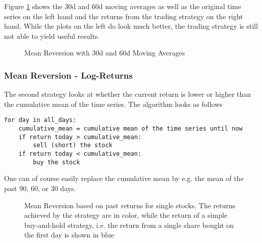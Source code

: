 Figure \ref{fig:30d_60d_plot} shows the 30d and 60d moving averages as well as the original time series on the left hand and the returns from the trading strategy on the right hand. While the plots on the left do look much better, the trading strategy is still not able to yield useful results. 

\begin{figure}[h!]
    \centering
    \begin{minipage}[b]{0.49\textwidth}
        \centering
            \begin{adjustbox}{width=\textwidth,center}
               
            \end{adjustbox}
    \end{minipage}
    \hfill
    \begin{minipage}[b]{0.49\textwidth}
        \centering
        \begin{adjustbox}{width=\textwidth,center}
            
        \end{adjustbox}
    \end{minipage}
    \caption{Mean Reversion with 30d and 60d Moving Averages}
    \label{fig:30d_60d_plot}
\end{figure}{}

\subsubsection{Mean Reversion - Log-Returns}
The second strategy looks at whether the current return is lower or higher than the cumulative mean of the time series. The algorithm looks as follows

\begin{verbatim}
for day in all_days: 
    cumulative_mean = cumulative mean of the time series until now
    if return today > cumulative_mean:
        sell (short) the stock
    if return today < cumulative_mean:
        buy the stock
\end{verbatim}

One can of course easily replace the cumulative mean by e.g. the mean of the past 90, 60, or 30 days. 

\begin{figure}[h!]
    \centering
    \begin{adjustbox}{width=.95\textwidth,center}
        
    \end{adjustbox}  
    \caption{Mean Reversion based on past returns for single stocks. The returns achieved by the strategy are in color, while the return of a simple buy-and-hold strategy, i.e. the return from a single share bought on the first day is shown in blue}
    \label{fig:mean_reversion_returns}
\end{figure}{}

